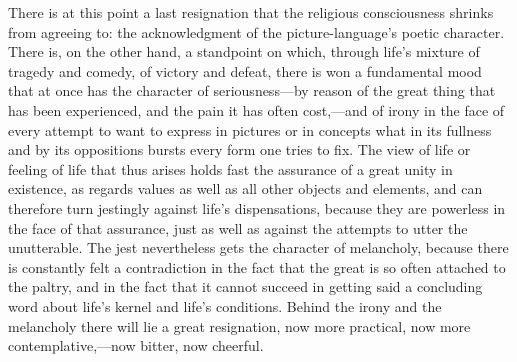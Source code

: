 \documentclass[12pt,a4paper]{book}
\newcommand{\opage}[1]{\marginnote{\footnotesize\textit{[#1]}}}
\begin{document}
There is at this point a last resignation that the religious consciousness shrinks from agreeing to: the
acknowledgment of the picture-language's poetic character. There is, on the other hand, a standpoint on
which, through life's mixture of tragedy and comedy, of victory and defeat, there is won a fundamental
mood that at once has the character of seriousness---by reason of the great thing that has been
experienced, and the \opage{378}pain it has often cost,---and of irony in the face of every attempt to want to
express in pictures or in concepts what in its fullness and by its oppositions bursts every form one
tries to fix. The view of life or feeling of life that thus arises holds fast the assurance of a great
unity in existence, as regards values as well as all other objects and elements, and can therefore turn
jestingly against life's dispensations, because they are powerless in the face of that assurance, just as
well as against the attempts to utter the unutterable. The jest nevertheless gets the character of
melancholy, because there is constantly felt a contradiction in the fact that the great is so often
attached to the paltry, and in the fact that it cannot succeed in getting said a concluding word about
life's kernel and life's conditions. Behind the irony and the melancholy there will lie a great
resignation, now more practical, now more contemplative,---now bitter, now cheerful.
\end{document}
